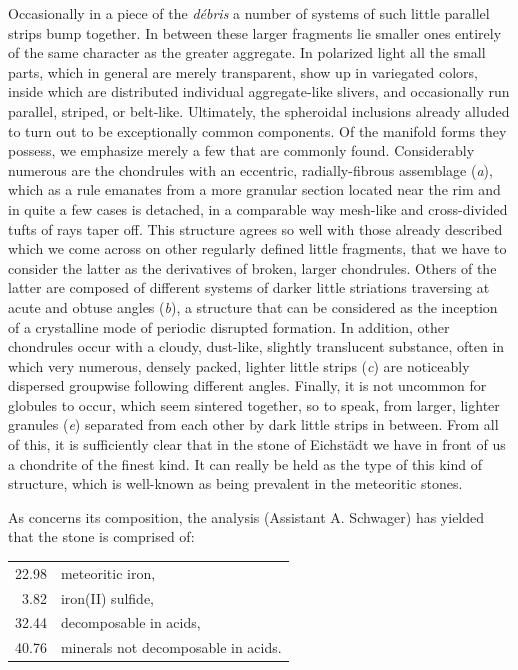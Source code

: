 \documentclass[a4paper, 12pt, oneside]{article}
\begin{document}
Occasionally in a piece of the \emph{débris} a number of systems of such little parallel strips bump together. In between these larger fragments lie smaller ones entirely of the same character as the greater aggregate. In polarized light all the small parts, which in general are merely transparent, show up in variegated colors, inside which are distributed individual aggregate-like slivers, and occasionally run parallel, striped, or belt-like. Ultimately, the spheroidal inclusions already alluded to turn out to be exceptionally common components. Of the manifold forms they possess, we emphasize merely a few that are commonly found. Considerably numerous are the chondrules with an eccentric, radially-fibrous assemblage (\emph{a}), which as a rule emanates from a more granular section located near the rim and in quite a few cases is detached, in a comparable way mesh-like and cross-divided tufts of rays taper off. This structure agrees so well with those already described which we come across on other regularly defined little fragments, that we have to consider the latter as the derivatives of broken, larger chondrules. Others of the latter are composed of different systems of darker little striations traversing at acute and obtuse angles (\emph{b}), a structure that can be considered as the inception of a crystalline mode of periodic disrupted formation. In addition, other chondrules occur with a cloudy, dust-like, slightly translucent substance, often in which very numerous, densely packed, lighter little strips (\emph{c}) are noticeably dispersed groupwise following different angles. Finally, it is not uncommon for globules to occur, which seem sintered together, so to speak, from larger, lighter granules (\emph{e}) separated from each other by dark little strips in between. From all of this, it is sufficiently clear that in the stone of Eichstädt we have in front of us a chondrite of the finest kind. It can really be held as the type of this kind of structure, which is well-known as being prevalent in the meteoritic stones.

As concerns its composition, the analysis (Assistant A. Schwager) has yielded that the stone is comprised of: 
\begin{center}
    \begin{tabular}{r l}
        22.98 & meteoritic iron,\\
        3.82 & iron(II) sulfide,\\
        32.44 & decomposable in acids,\\
        40.76 & minerals not decomposable in acids.\\
    \end{tabular}
\end{center}
\end{document}

